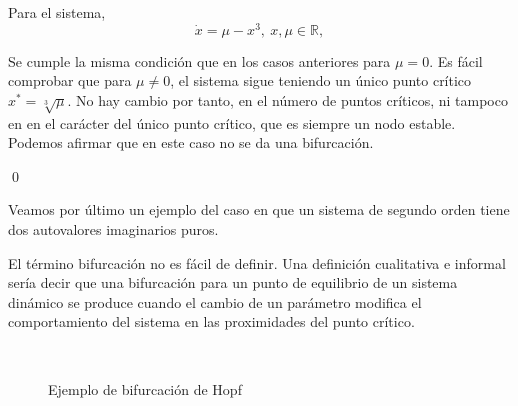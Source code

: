 \begin{example}[No bifurcación] Para el sistema,
\begin{equation*}
\dot x = \mu - x^3,\  x, \mu \in \mathbb{R},  
\end{equation*}

Se cumple la misma condición que en los casos anteriores para $\mu=0$. Es fácil comprobar que para $\mu \neq 0$, el sistema sigue teniendo un único punto crítico $x^*=\sqrt[3]{\mu}$. No hay cambio por tanto, en el número de puntos críticos, ni tampoco en en el carácter del único punto crítico, que es siempre un nodo estable.  Podemos afirmar que en este caso no se da una bifurcación.

\qed
\end{example}
Veamos por último un ejemplo del caso en que un sistema de segundo orden tiene dos autovalores imaginarios puros.

 El término bifurcación no es fácil de definir. Una definición cualitativa e informal sería decir que una bifurcación para un punto de equilibrio de un sistema dinámico se produce cuando el cambio de un parámetro modifica el comportamiento del sistema en las proximidades del punto crítico.
 
\begin{figure}
\centering
{}\\
\caption{Ejemplo de bifurcación de Hopf}
\label{fig:hopf}
\end{figure}

